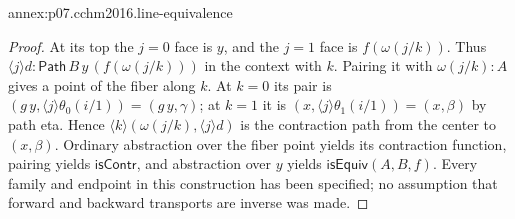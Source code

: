 \begin{annexitem}{annex:p07.cchm2016.line-equivalence}
\begin{proof}
At its top the \(j=0\) face is \(y\), and the \(j=1\) face is
\(f(\omega(j/k))\).  Thus
\(\langle j\rangle d:
\mathsf{Path}\,B\,y\,(f(\omega(j/k)))\) in the context with \(k\).
Pairing it with \(\omega(j/k):A\) gives a point of the fiber along
\(k\).  At \(k=0\) its pair is
\((g\,y,\langle j\rangle\theta_0(i/1))=(g\,y,\gamma)\);
at \(k=1\) it is
\((x,\langle j\rangle\theta_1(i/1))=(x,\beta)\) by path eta.
Hence
\(\langle k\rangle(\omega(j/k),\langle j\rangle d)\)
is the contraction path from the center to \((x,\beta)\).
Ordinary abstraction over the fiber point yields its contraction
function, pairing yields \(\mathsf{isContr}\), and abstraction over
\(y\) yields \(\mathsf{isEquiv}(A,B,f)\).
Every family and endpoint in this construction has been specified;
no assumption that forward and backward transports are inverse was
made.
\end{proof}
\end{annexitem}
